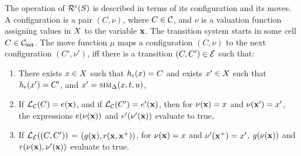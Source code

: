 The operation of $\mathcal{R}^{\epsilon}(S)$ is described in
terms of its configuration and its moves. A configuration is a pair
$(C, \nu)$, where $C \in \mathcal{C}$, and $\nu$ is a valuation function
assigning values in $X$ to the variable $\mathbf{x}$.  The
transition system starts in some cell $C \in \mathcal{C}_{\mathsf{init}}$.  The move
function $\mu$ maps a configuration $(C,\nu)$ to the next
configuration $(C',\nu')$, iff there is a transition $(C,C') \in
\mathcal{E}$ such that:
\begin{enumerate}
\item
There exists $x \in X$ such that
$h_\epsilon(x) = C$ and exists $x' \in
X$ such that $h_\epsilon(x') = C'$,
and $x' = \mbox{\sc sim}_\Delta(x, t, u)$,
\item
If $\mathcal{L}_\mathcal{C}(C) =  e(\mathbf{x})$, and if
$\mathcal{L}_\mathcal{C}(C') = e'(\mathbf{x})$, then for $\nu(\mathbf{x}) =
x$ and $\nu(\mathbf{x}') = x'$, the expressions
$e(\nu(\mathbf{x}))$ and $e'(\nu'(\mathbf{x}))$ evaluate to true, 
\item
If $\mathcal{L}_\mathcal{E}((C,C'))$ = $(g(\mathbf{x}), r(\mathbf{x},\mathbf{x}^{+}))$, 
for $\nu(\mathbf{x}) = x$ and $\nu'(\mathbf{x}^{+}) = x'$, 
$g(\nu(\mathbf{x}))$ and $r(\nu(\mathbf{x}), \nu'(\mathbf{x}))$ evaluate to true.
\end{enumerate}

